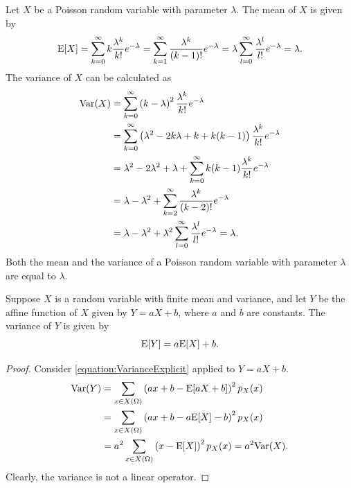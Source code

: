 \begin{example}
Let $X$ be a Poisson random variable with parameter $\lambda$.
The mean of $X$ is given by
\begin{equation*}
\mathrm{E} [X] = \sum_{k=0}^{\infty} k \frac{\lambda^k}{k!} e^{- \lambda}
= \sum_{k=1}^{\infty} \frac{\lambda^k}{(k-1)!} e^{- \lambda}
= \lambda \sum_{l=0}^{\infty} \frac{\lambda^l}{l!} e^{- \lambda}
= \lambda .
\end{equation*}
The variance of $X$ can be calculated as
\begin{equation*} \label{equation:VarianceExplicit}
\begin{split}
\mathrm{Var} (X) &= \sum_{k=0}^{\infty} \left( k - \lambda \right)^2
\frac{\lambda^k}{k!} e^{- \lambda} \\
&= \sum_{k=0}^{\infty} \left(\lambda^2 - 2 k \lambda + k + k(k-1) \right)
\frac{\lambda^k}{k!} e^{- \lambda} \\
&= \lambda^2 - 2 \lambda^2 + \lambda +
\sum_{k=0}^{\infty} k(k-1) \frac{\lambda^k}{k!} e^{- \lambda} \\
&= \lambda - \lambda^2 +
\sum_{k=2}^{\infty} \frac{\lambda^k}{(k-2)!} e^{- \lambda} \\
&= \lambda - \lambda^2 +
\lambda^2 \sum_{l=0}^{\infty} \frac{\lambda^l}{l!} e^{- \lambda}
= \lambda .
\end{split}
\end{equation*}
Both the mean and the variance of a Poisson random variable with parameter $\lambda$ are equal to $\lambda$.
\end{example}

\begin{theorem}
Suppose $X$ is a random variable with finite mean and variance, and let $Y$ be the affine function of $X$ given by $Y = aX + b$, where $a$ and $b$ are constants.
The variance of $Y$ is given by
\begin{equation*}
\mathrm{E} [Y] = a \mathrm{E} [X] + b.
\end{equation*}
\end{theorem}
\begin{proof}
Consider \eqref{equation:VarianceExplicit} applied to $Y = aX + b$.
\begin{equation*}
\begin{split}
\mathrm{Var}(Y)
&= \sum_{x \in X(\Omega)} \left( ax + b - \mathrm{E} [aX + b] \right)^2 p_X(x) \\
&= \sum_{x \in X(\Omega)} \left( ax + b - a \mathrm{E} [X] - b \right)^2 p_X(x) \\
&= a^2 \sum_{x \in X(\Omega)} \left( x - \mathrm{E} [X] \right)^2 p_X(x)
= a^2 \mathrm{Var}(X) .
\end{split}
\end{equation*}
Clearly, the variance is not a linear operator.
\end{proof}


